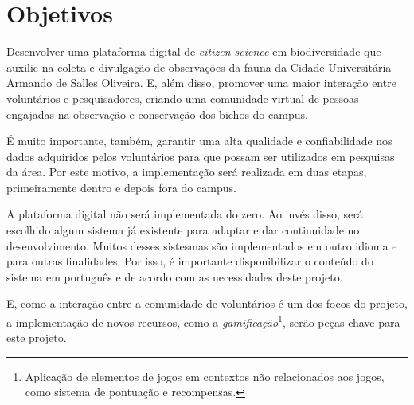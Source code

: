 \section{Objetivos}
Desenvolver uma plataforma digital de \emph{citizen science} em biodiversidade que auxilie na coleta e divulgação de observações da fauna da Cidade Universitária Armando de Salles Oliveira. E, além disso, promover uma maior interação entre voluntários e pesquisadores, criando uma comunidade virtual de pessoas engajadas na observação e conservação dos bichos do campus.

É muito importante, também, garantir uma alta qualidade e confiabilidade nos dados adquiridos pelos voluntários para que possam ser utilizados em pesquisas da área. Por este motivo, a implementação será realizada em duas etapas, primeiramente dentro e depois fora do campus.

A plataforma digital não será implementada do zero. Ao invés disso, será escolhido algum sistema já existente para adaptar e dar continuidade no desenvolvimento. Muitos desses sistesmas são implementados em outro idioma e para outras finalidades. Por isso, é importante disponibilizar o conteúdo do sistema em português e de acordo com as necessidades deste projeto.

E, como a interação entre a comunidade de voluntários é um dos focos do projeto, a implementação de novos recursos, como a \emph{gamificação}\footnote{Aplicação de elementos de jogos em contextos não relacionados aos jogos, como sistema de pontuação e recompensas.}, serão peças-chave para este projeto.